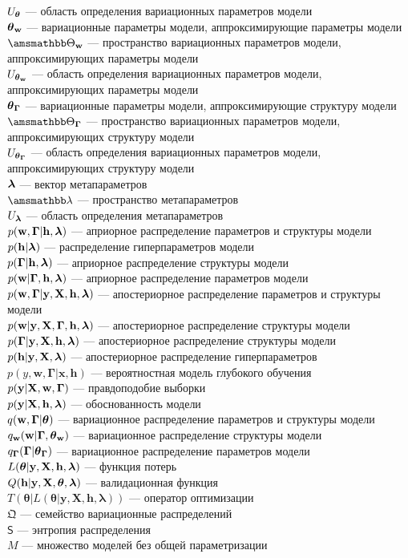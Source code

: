 $\Uteta$ --- область определения вариационных параметров модели\\
$\tetaw$ --- вариационные параметры модели, аппроксимирующие параметры модели\\
$\Tetawb$ --- пространство вариационных параметров модели, аппроксимирующих параметры модели\\
$\Utetaw$ --- область определения вариационных параметров модели, аппроксимирующих параметры модели\\
$\tetaG$ --- вариационные параметры модели, аппроксимирующие структуру модели\\
$\TetaGb$ --- пространство вариационных параметров модели, аппроксимирующих структуру модели\\
$\UtetaG$ --- область определения вариационных параметров модели, аппроксимирующих структуру модели\\
$\lam$ --- вектор метапараметров\\
$\Lamb$ --- пространство метапараметров\\
$\Ulam$ --- область определения  метапараметров\\
$\prior$ --- априорное распределение параметров и структуры модели\\
$\priorh$ ---  распределение гиперпараметров модели\\
$\priorG$ --- априорное распределение структуры модели\\
$\priorw$ --- априорное распределение  параметров модели\\
$\post$ --- апостериорное распределение параметров и структуры модели\\
$\postw$ --- апостериорное распределение структуры модели\\
$\postG$ --- апостериорное распределение  структуры модели\\
$\posth$ --- апостериорное распределение  гиперпараметров \\
$p({y}, \mathbf{w},  \boldsymbol{\Gamma}|\mathbf{x}, \mathbf{h})$ --- вероятностная модель глубокого обучения\\
$\LL$ --- правдоподобие выборки\\
$\EV$ --- обоснованность модели\\
$\q$ --- вариационное распределение параметров и структуры модели\\
$\qw$ --- вариационное распределение структуры модели\\
$\qG$ --- вариационное распределение параметров модели\\
$\Loss$ --- функция потерь\\
$\Val$ --- валидационная функция\\
$T(\boldsymbol{\theta} |L(\boldsymbol{\theta} |\mathbf{y},\mathbf{X},\mathbf{h},\boldsymbol{\lambda}))$ --- оператор оптимизации\\
$\mathfrak{Q}$ --- семейство вариационные распределений\\
$\mathsf{S}$ --- энтропия распределения\\
$M$ --- множество моделей без общей параметризации\\
